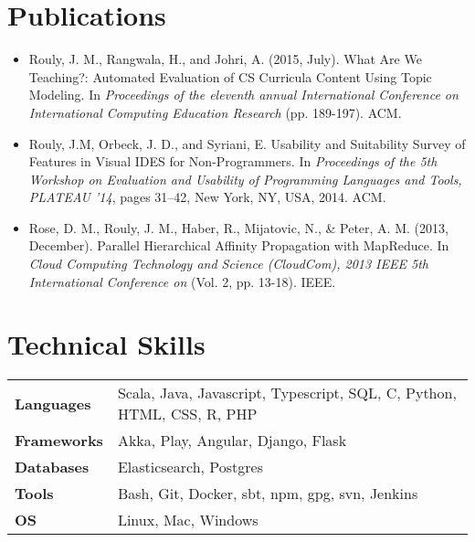 \documentclass[letterpaper]{article}
\newenvironment{details}
{\begin{itemize}}
{\end{itemize}}
\begin{document}
  \section{Publications}
  \noindent
  \begin{details}
  \item Rouly, J. M., Rangwala, H., and Johri, A. (2015, July). What Are We
  Teaching?: Automated Evaluation of CS Curricula Content Using Topic
  Modeling. In \emph{Proceedings of the eleventh annual International
  Conference on International Computing Education Research} (pp. 189-197). ACM.

  \item Rouly, J.M, Orbeck, J. D., and Syriani, E.
  Usability and Suitability Survey of Features in Visual IDES for
  Non-Programmers. In \emph{Proceedings of the 5th Workshop on Evaluation
  and Usability of Programming Languages and Tools, PLATEAU '14}, pages
  31–42, New York, NY, USA, 2014. ACM.

  \item Rose, D. M., Rouly, J. M., Haber, R., Mijatovic, N., \& Peter, A.
  M. (2013, December). Parallel Hierarchical Affinity Propagation with
  MapReduce. In \emph{Cloud Computing Technology and Science (CloudCom),
  2013 IEEE 5th International Conference on} (Vol. 2, pp. 13-18). IEEE.
  \end{details}


  \section{Technical Skills}

  \noindent
  \begin{tabularx}{\textwidth}{@{}lX@{}}
    \textbf{Languages} & Scala, Java, Javascript, Typescript, SQL, C, Python, HTML, CSS, R, PHP \\
    \textbf{Frameworks} & Akka, Play, Angular, Django, Flask \\
    \textbf{Databases} & Elasticsearch, Postgres \\
    \textbf{Tools} & Bash, Git, Docker, sbt, npm, gpg, svn, Jenkins \\
    \textbf{OS} & Linux, Mac, Windows
  \end{tabularx}
\end{document}
